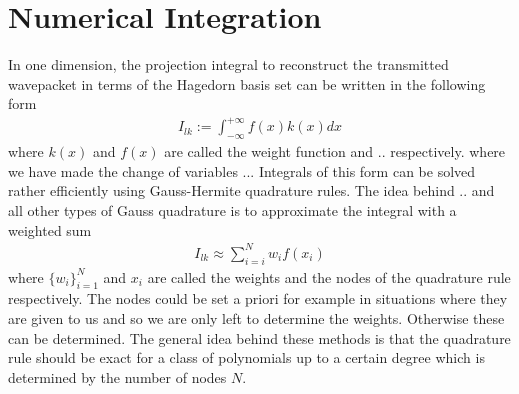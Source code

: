 \documentclass[12pt]{article}
\numberwithin{equation}{section}
\begin{document}
  \section{Numerical Integration}
  In one dimension, the projection integral to reconstruct the transmitted 
  wavepacket in terms of the Hagedorn basis set can be written in the following 
  form 
  \begin{equation}
   \begin{split}
     I_{lk} 
     :=
      \int_{-\infty}^{+ \infty}
        f(x) 
        k(x) dx
   \end{split} 
  \end{equation}
  where $k(x)$ and $f(x)$ are called the weight function and .. 
  respectively.
  where we have made the change of variables ...
  Integrals of this form can be solved rather efficiently using Gauss-Hermite 
  quadrature rules. The idea behind .. and all other types of Gauss quadrature 
  is to approximate the integral with a weighted sum 
  \begin{equation}
    \begin{split}
      I_{lk} 
      \approx 
      \sum_{i=i}^N 
      w_{i} f(x_i)
    \end{split}
  \end{equation}
  where $\{w_{i}\}_{i=1}^N$ and $x_i$ are called the weights and the nodes 
  of the quadrature rule respectively. The nodes could be set a priori for 
  example in situations where they are given to us and so we are only left to 
  determine the weights. Otherwise these can be determined. The general idea 
  behind these methods is that the quadrature rule should be exact for a class 
  of polynomials up to a certain degree which is determined by the number of nodes $N$.
%
%
%
%
\end{document}
